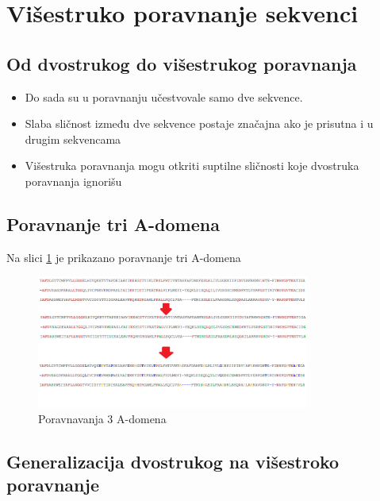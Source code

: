 \section{Višestruko poravnanje sekvenci}

\subsection{Od dvostrukog do višestrukog poravnanja}
\begin{itemize}
    \item Do sada su u poravnanju učestvovale samo dve sekvence.
    \item Slaba sličnost između dve sekvence postaje značajna ako je prisutna i u drugim sekvencama
    \item Višestruka poravnanja mogu otkriti suptilne sličnosti koje dvostruka poravnanja ignorišu
\end{itemize}

\subsection{Poravnanje tri A-domena}
Na slici \ref{slika:poravnavanjaTriA} je prikazano poravnanje tri A-domena
\begin{figure}[]
\centering
\includegraphics[width=0.8\textwidth]{poglavlja/5/slike/poravnavanjaTriAdomena.png}
\caption{Poravnavanja 3 A-domena}
\label{slika:poravnavanjaTriA}
\end{figure}

\subsection{Generalizacija dvostrukog na višestroko poravnanje}

